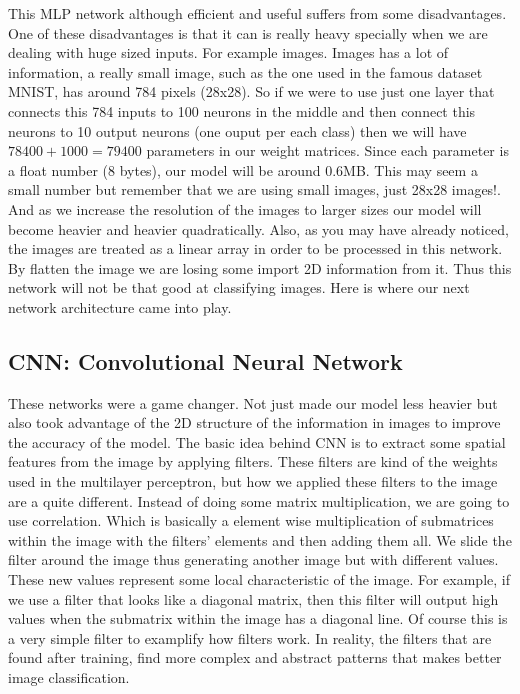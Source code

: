 \documentclass[english,preprint,JIP]{ipsj}
\begin{document}
This MLP network although efficient and useful suffers from some disadvantages.
One of these disadvantages is that it can is really heavy specially when we are
dealing with huge sized inputs. For example images. Images has a lot of
information, a really small image, such as the one used in the famous dataset
MNIST, has around 784 pixels (28x28). So if we were to use just one layer that
connects this 784 inputs to 100 neurons in the middle and then connect this
neurons to 10 output neurons (one ouput per each class) then we will have $78400
    + 1000 = 79400$ parameters in our weight matrices. Since each parameter is a
float number (8 bytes), our model will be around 0.6MB. This may seem a small
number but remember that we are using small images, just 28x28 images!. And as
we increase the resolution of the images to larger sizes our model will become
heavier and heavier quadratically. Also, as you may have already noticed, the
images are treated as a linear array in order to be processed in this network.
By flatten the image we are losing some import 2D information from it. Thus this
network will not be that good at classifying images. Here is where our next
network architecture came into play.

\subsection{CNN: Convolutional Neural Network}

These networks were a game changer. Not just made our model less heavier but
also took advantage of the 2D structure of the information in images to improve
the accuracy of the model. The basic idea behind CNN is to extract some spatial
features from the image by applying filters. These filters are kind of the
weights used in the multilayer perceptron, but how we applied these filters to
the image are a quite different. Instead of doing some matrix multiplication, we
are going to use correlation. Which is basically a element wise multiplication
of submatrices within the image with the filters' elements and then adding them
all. We slide the filter around the image thus generating another image but with
different values. These new values represent some local characteristic of the
image. For example, if we use a filter that looks like a diagonal matrix, then
this filter will output high values when the submatrix within the image has a
diagonal line. Of course this is a very simple filter to examplify how filters
work. In reality, the filters that are found after training, find more complex
and abstract patterns that makes better image classification.
\end{document}
